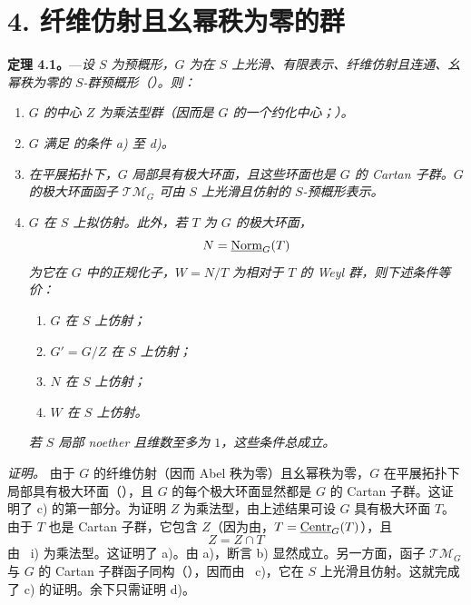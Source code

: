 %
\section*{4. 纤维仿射且幺幂秩为零的群}

\noindent{}%
\textbf{定理 4.1。}---\textit{设 \(S\) 为预概形，\(G\) 为在 \(S\) 上光滑、有限表示、纤维仿射且连通、幺幂秩为零的 \(S\)-群预概形（）。则：}
\begin{enumerate}
\renewcommand{\labelenumi}{\textit{\alph{enumi})}}
\item \textit{\(G\) 的中心 \(Z\) 为乘法型群（因而是 \(G\) 的一个约化中心；）。}
\item \textit{\(G\) 满足  的条件 a) 至 d)。}
\item \textit{在平展拓扑下，\(G\) 局部具有极大环面，且这些环面也是 \(G\) 的 Cartan 子群。\(G\) 的极大环面函子 \(\mathscr{TM}_G\) 可由 \(S\) 上光滑且仿射的 \(S\)-预概形表示。}
\item \textit{\(G\) 在 \(S\) 上拟仿射。此外，若 \(T\) 为 \(G\) 的极大环面，}
\[
  N=\underline{\operatorname{Norm}}_G(T)
\]
\textit{为它在 \(G\) 中的正规化子，\(W=N/T\) 为相对于 \(T\) 的 Weyl 群，则下述条件等价：}
\begin{enumerate}
\renewcommand{\labelenumii}{\textit{(\roman{enumii})}}
\item \textit{\(G\) 在 \(S\) 上仿射；}
\item \textit{\(G'=G/Z\) 在 \(S\) 上仿射；}
\item \textit{\(N\) 在 \(S\) 上仿射；}
\item \textit{\(W\) 在 \(S\) 上仿射。}
\end{enumerate}
\textit{若 \(S\) 局部 noether 且维数至多为 \(1\)，这些条件总成立。}
\end{enumerate}

\medskip
\noindent\textit{证明。}
由于 \(G\) 的纤维仿射（因而 Abel 秩为零）且幺幂秩为零，\(G\) 在平展拓扑下局部具有极大环面（），且 \(G\) 的每个极大环面显然都是 \(G\) 的 Cartan 子群。这证明了 c) 的第一部分。为证明 \(Z\) 为乘法型，由上述结果可设 \(G\) 具有极大环面 \(T\)。由于 \(T\) 也是 Cartan 子群，它包含 \(Z\)（因为由，\(T=\underline{\operatorname{Centr}}_G(T)\)），且
\[
  Z=Z\cap T
\]
由 ~i) 为乘法型。这证明了 a)。由 a)，断言 b) 显然成立。另一方面，函子 \(\mathscr{TM}_G\) 与 \(G\) 的 Cartan 子群函子同构（），因而由 ~c)，它在 \(S\) 上光滑且仿射。这就完成了 c) 的证明。余下只需证明 d)。

